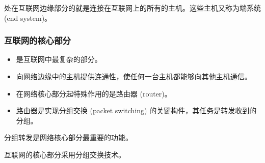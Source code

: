 \documentclass[11pt]{article}
\begin{document}
处在互联网边缘部分的就是连接在互联网上的所有的主机。这些主机又称为端系统 (end system)。

\subsubsection{互联网的核心部分}
\label{sec:org6bd3be3}
\begin{itemize}
\item 是互联网中最复杂的部分。
\item 向网络边缘中的主机提供连通性，使任何一台主机都能够向其他主机通信。
\item 在网络核心部分起特殊作用的是路由器 (router)。
\item 路由器是实现分组交换 (packet switching) 的关键构件，其任务是转发收到的分组。
\end{itemize}

分组转发是网络核心部分最重要的功能。

互联网的核心部分采用分组交换技术。
\end{document}
